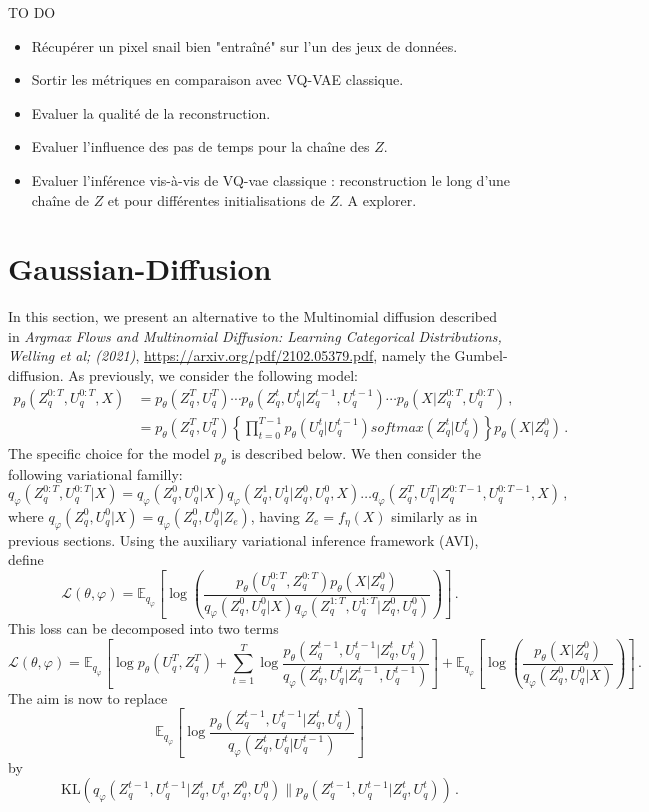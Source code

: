 \documentclass{article}
\begin{document}
TO DO 

\begin{itemize}
\item Récupérer un pixel snail bien "entraîné" sur l'un des jeux de données.
\item Sortir les métriques en comparaison avec VQ-VAE classique.
\item Evaluer la qualité de la reconstruction.
\item Evaluer l'influence des pas de temps pour la chaîne des $Z$.
\item Evaluer l'inférence vis-à-vis de VQ-vae classique : reconstruction le long d'une chaîne de $Z$ et pour différentes initialisations de $Z$. A explorer.
\end{itemize}



\clearpage
\newpage

\section{Gaussian-Diffusion}
In this section, we present an alternative to the Multinomial diffusion described in {\em Argmax Flows and Multinomial Diffusion: Learning Categorical Distributions, Welling et al; (2021)}, \url{https://arxiv.org/pdf/2102.05379.pdf}, namely the Gumbel-diffusion.  As previously, we consider the following model:
\begin{align*}
p_{\theta}(Z_q^{0:T},U_q^{0:T}, X) &= p_{\theta}(Z_q^T,U_q^T) \cdots p_{\theta}(Z_q^t,U_q^t|Z_q^{t-1},U_q^{t-1}) \cdots p_{\theta}(X|Z^{0:T}_q,U_q^{0:T})\,,\\
&= p_{\theta}(Z_q^T,U_q^T) \left\{\prod_{t=0}^{T-1}p_{\theta}(U_q^t|U_q^{t-1})softmax(Z_q^t|U_q^t)\right\}p_{\theta}(X|Z^{0}_q)\,.
\end{align*}
The specific choice for the model $p_\theta$ is described below. We then consider the following variational familly:
$$
q_{\varphi}(Z_q^{0:T},U_q^{0:T}| X) = q_{\varphi}(Z_q^0,U_q^0 | X) q_{\varphi}(Z_q^1,U_q^1 | Z_q^0, U_q^0,X) \ldots  q_{\varphi}(Z_q^T,U_q^T | Z_q^{0:T-1}, U_q^{0:T-1}, X)\,,
$$
where $q_{\varphi}(Z_q^0,U_q^0 | X) = q_{\varphi}(Z_q^0,U_q^0 | Z_e)$, having $Z_e = f_\eta(X)$ similarly as in  previous sections. Using the auxiliary variational inference framework (AVI), define
$$
\mathcal{L}(\theta, \varphi) = \mathbb{E}_{q_\varphi} \left[ \log\left(\frac{p_\theta(U_q^{0:T},Z_q^{0:T})p_\theta(X|Z_q^0)}{q_\varphi(Z_q^0,U_q^0|X) q_\varphi(Z_q^{1:T},U_q^{1:T}|Z_q^0,U_q^0)}\right) \right]\,.
$$
This loss can be decomposed into two terms
$$
\mathcal{L}(\theta, \varphi) = \mathbb{E}_{q_\varphi} \left[\log p_\theta(U_q^T,Z_q^T) + \sum_{t=1}^T\log  \frac{p_\theta(Z_q^{t-1},U_q^{t-1}|Z_q^t,U_q^t)}{q_\varphi(Z_q^{t},U_q^t|Z_q^{t-1},U_q^{t-1})} \right] + \mathbb{E}_{q_\varphi} \left[ \log\left(\frac{p_\theta(X|Z_q^0)}{q_\varphi(Z_q^0,U_q^0|X)}\right) \right]\,.
$$
The aim is now to replace 
$$
 \mathbb{E}_{q_\varphi} \left[\log  \frac{p_\theta(Z_q^{t-1},U_q^{t-1}|Z_q^t,U_q^t)}{q_\varphi(Z_q^{t},U_q^t|U_q^{t-1})} \right]
$$
by
$$
\mathrm{KL}(q_\varphi(Z_q^{t-1},U_q^{t-1}|Z_q^t,U_q^{t},Z_q^0,U_q^{0})\|p_\theta(Z_q^{t-1},U_q^{t-1}|Z_q^t,U_q^t))\,.
$$
\end{document}
